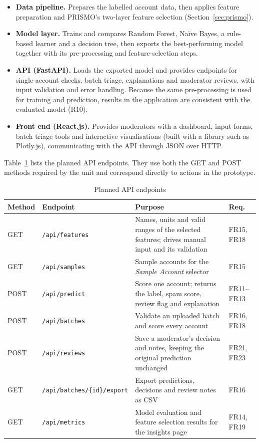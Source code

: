 \begin{itemize}[nosep]
  \item \textbf{Data pipeline.} Prepares the labelled account data, then applies feature preparation and PRISMO's two-layer feature selection (Section~\ref{sec:prismo}).
  \item \textbf{Model layer.} Trains and compares Random Forest, Na\"ive Bayes, a rule-based learner and a decision tree, then exports the best-performing model together with its pre-processing and feature-selection steps.
  \item \textbf{API (FastAPI).} Loads the exported model and provides endpoints for single-account checks, batch triage, explanations and moderator reviews, with input validation and error handling. Because the same pre-processing is used for training and prediction, results in the application are consistent with the evaluated model (R10).
  \item \textbf{Front end (React.js).} Provides moderators with a dashboard, input forms, batch triage tools and interactive visualisations (built with a library such as Plotly.js), communicating with the API through JSON over HTTP.
\end{itemize}

Table~\ref{tab:api} lists the planned API endpoints. They use both the GET and POST methods required by the unit and correspond directly to actions in the prototype.

\begin{table}[htbp]
\centering
\caption{Planned API endpoints}
\label{tab:api}
\begin{tabularx}{\textwidth}{@{}l >{\raggedright\arraybackslash}p{} >{\raggedright\arraybackslash}X l@{}}
  \toprule
  \textbf{Method} & \textbf{Endpoint} & \textbf{Purpose} & \textbf{Req.} \\
  \midrule
  GET  & \texttt{/api/features} & Names, units and valid ranges of the selected features; drives manual input and its validation & FR15, FR18 \\
  GET  & \texttt{/api/samples} & Sample accounts for the \emph{Sample Account} selector & FR15 \\
  POST & \texttt{/api/predict} & Score one account; returns the label, spam score, review flag and explanation & FR11--FR13 \\
  POST & \texttt{/api/batches} & Validate an uploaded batch and score every account & FR16, FR18 \\
  POST & \texttt{/api/reviews} & Save a moderator's decision and notes, keeping the original prediction unchanged & FR21, FR23 \\
  GET  & \texttt{/api/batches/\{id\}/export} & Export predictions, decisions and review notes as CSV & FR16 \\
  GET  & \texttt{/api/metrics} & Model evaluation and feature selection results for the insights page & FR14, FR19 \\
  \bottomrule
\end{tabularx}
\end{table}

